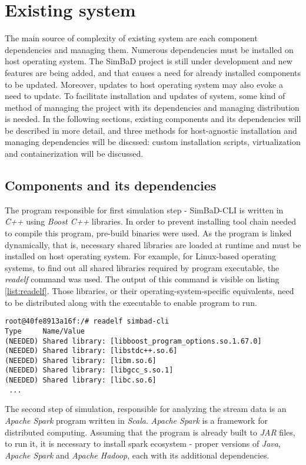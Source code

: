 \chapter{Existing system}
The main source of complexity of existing system are each component dependencies and managing them. Numerous dependencies must be installed on host operating system. The SimBaD project is still under development and new features are being added, and that causes a need for already installed components to be updated. Moreover, updates to host operating system may also evoke a need to update. To facilitate installation and updates of system, some kind of method of managing the project with its dependencies and managing distribution is needed. In the following sections, existing components and its dependencies will be described in more detail, and three methods for host-agnostic installation and managing dependencies will be discssed: custom installation scripts, virtualization and containerization  will be discussed.
\section{Components and its dependencies}
 The program responsible for first simulation step - SimBaD-CLI is written in \textit{C++} using \textit{Boost C++} libraries. In order to prevent installing tool chain needed to compile this program, pre-build binaries were used. As the program is linked dynamically, that is, necessary shared libraries are loaded at runtime and must be installed on host operating system. For example, for Linux-based operating systems, to find out all shared libraries required by program executable, the \textit{readelf} command was used. The output of this command is visible on listing \ref{list:readelf}. Those libraries, or their operating-system-specific equivalents, need to be distributed along with the executable to enable program to run. 
\begin{lstlisting}[label=list:readelf,caption=The output of readelf command (Tag column ommited), basicstyle=\footnotesize\ttfamily]
root@40fe8913a16f:/# readelf simbad-cli 
Type     Name/Value
(NEEDED) Shared library: [libboost_program_options.so.1.67.0]
(NEEDED) Shared library: [libstdc++.so.6]
(NEEDED) Shared library: [libm.so.6]
(NEEDED) Shared library: [libgcc_s.so.1]
(NEEDED) Shared library: [libc.so.6]
 ...
\end{lstlisting}

The second step of simulation, responsible for analyzing the stream data is an \textit{Apache Spark} program written in \textit{Scala}. \textit{Apache Spark} is a framework for distributed computing. Assuming that the program is already built to \textit{JAR} files, to run it, it is necessary to install spark ecosystem - proper versions of \textit{Java}, \textit{Apache Spark} and \textit{Apache Hadoop}, each with its additional dependencies.

